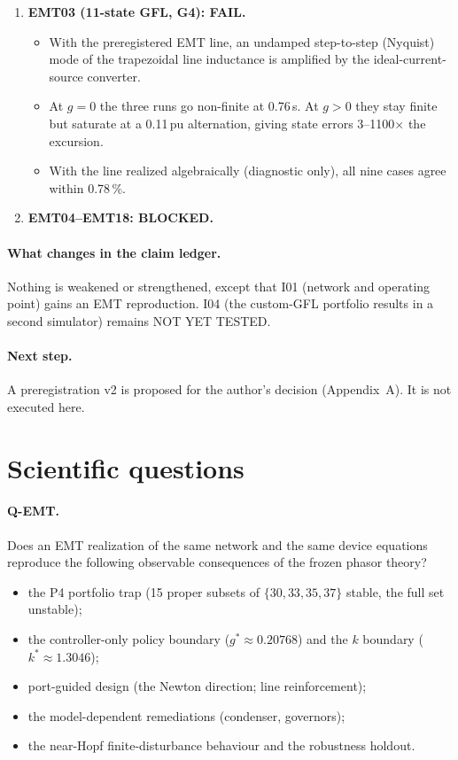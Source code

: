 \documentclass[10pt,a4paper]{article}
\begin{document}
\begin{enumerate}
\begin{itemize}
    $2\times10^{-4}$.
  \end{itemize}
\item \textbf{EMT03 (11-state GFL, G4): FAIL.}
  \begin{itemize}
  \item With the preregistered EMT line, an undamped step-to-step (Nyquist)
    mode of the trapezoidal line inductance is amplified by the
    ideal-current-source converter.
  \item At $g=0$ the three runs go non-finite at 0.76\,s. At $g>0$ they stay
    finite but saturate at a 0.11\,pu alternation, giving state errors
    3--1100$\times$ the excursion.
  \item With the line realized algebraically (diagnostic only), all nine cases
    agree within 0.78\,\%.
  \end{itemize}
\item \textbf{EMT04--EMT18: BLOCKED.}
\end{enumerate}

\paragraph{What changes in the claim ledger.} Nothing is weakened or
strengthened, except that I01 (network and operating point) gains an EMT
reproduction. I04 (the custom-GFL portfolio results in a second simulator)
remains NOT YET TESTED.

\paragraph{Next step.} A preregistration v2 is proposed for the author's
decision (Appendix~A). It is not executed here.

\section{Scientific questions}

\paragraph{Q-EMT.} Does an EMT realization of the same network and the same
device equations reproduce the following observable consequences of the
frozen phasor theory?
\begin{itemize}
\item the P4 portfolio trap (15 proper subsets of $\{30,33,35,37\}$ stable,
  the full set unstable);
\item the controller-only policy boundary ($g^*\approx0.20768$) and the $k$
  boundary ($k^*\approx1.3046$);
\item port-guided design (the Newton direction; line reinforcement);
\item the model-dependent remediations (condenser, governors);
\item the near-Hopf finite-disturbance behaviour and the robustness holdout.
\end{itemize}
\end{document}
